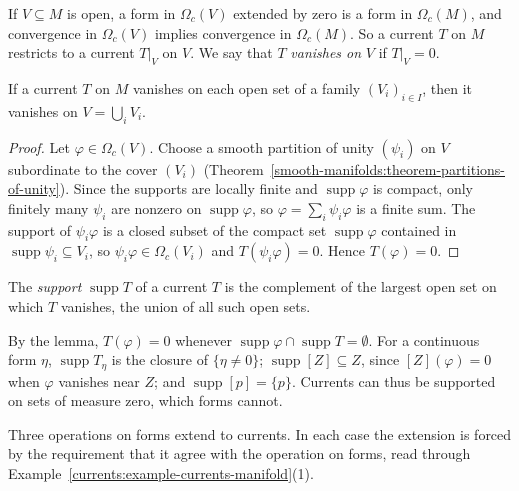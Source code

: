 If $V \subseteq M$ is open, a form in $\Omega_c(V)$ extended by zero is a form in $\Omega_c(M)$, and convergence in $\Omega_c(V)$ implies convergence in $\Omega_c(M)$. So a current $T$ on $M$
restricts to a current $T|_V$ on $V$. We say that $T$ \emph{vanishes on} $V$ if $T|_V = 0$.

\begin{lemma}\label{currents:lemma-currents-local}
If a current $T$ on $M$ vanishes on each open set of a family $(V_i)_{i \in I}$, then it vanishes on $V = \bigcup_iV_i$.
\end{lemma}

\begin{proof}
Let $\varphi \in \Omega_c(V)$. Choose a smooth partition of unity $(\psi_i)$ on $V$ subordinate to the cover $(V_i)$ (Theorem~\ref{smooth-manifolds:theorem-partitions-of-unity}). Since the supports are
locally finite and $\operatorname{supp}\varphi$ is compact, only finitely many $\psi_i$ are nonzero on $\operatorname{supp}\varphi$, so $\varphi = \sum_i\psi_i\varphi$ is a finite sum. The support of
$\psi_i\varphi$ is a closed subset of the compact set $\operatorname{supp}\varphi$ contained in $\operatorname{supp}\psi_i \subseteq V_i$, so $\psi_i\varphi \in \Omega_c(V_i)$ and $T(\psi_i\varphi) = 0$. Hence
$T(\varphi) = 0$.
\end{proof}

\begin{definition}\label{currents:definition-current-support}
The \emph{support} $\operatorname{supp}T$ of a current $T$ is the complement of the largest open set on which $T$ vanishes, the union of all such open sets.
\end{definition}

By the lemma, $T(\varphi) = 0$ whenever $\operatorname{supp}\varphi \cap \operatorname{supp}T = \emptyset$. For a continuous form $\eta$, $\operatorname{supp}T_\eta$ is the closure of
$\{\eta \neq 0\}$; $\operatorname{supp}[Z] \subseteq Z$, since $[Z](\varphi) = 0$ when $\varphi$ vanishes near $Z$; and $\operatorname{supp}[p] = \{p\}$. Currents can thus be supported on
sets of measure zero, which forms cannot.

Three operations on forms extend to currents. In each case the extension is forced by the requirement that it agree with the operation on forms, read through
Example~\ref{currents:example-currents-manifold}(1).

